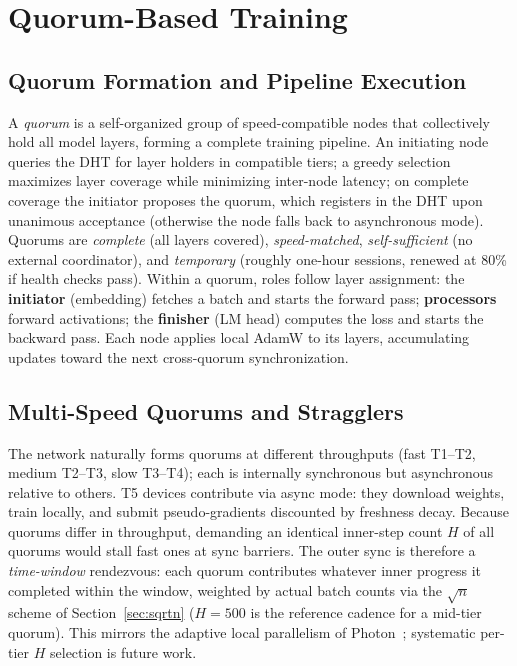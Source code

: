\documentclass[conference]{IEEEtran}
\begin{document}
\section{Quorum-Based Training}
\label{sec:quorum}

\subsection{Quorum Formation and Pipeline Execution}

A \emph{quorum} is a self-organized group of speed-compatible nodes that collectively hold all model layers, forming a complete training pipeline. An initiating node queries the DHT for layer holders in compatible tiers; a greedy selection maximizes layer coverage while minimizing inter-node latency; on complete coverage the initiator proposes the quorum, which registers in the DHT upon unanimous acceptance (otherwise the node falls back to asynchronous mode). Quorums are \emph{complete} (all layers covered), \emph{speed-matched}, \emph{self-sufficient} (no external coordinator), and \emph{temporary} (roughly one-hour sessions, renewed at 80\% if health checks pass). Within a quorum, roles follow layer assignment: the \textbf{initiator} (embedding) fetches a batch and starts the forward pass; \textbf{processors} forward activations; the \textbf{finisher} (LM head) computes the loss and starts the backward pass. Each node applies local AdamW to its layers, accumulating updates toward the next cross-quorum synchronization.

\subsection{Multi-Speed Quorums and Stragglers}
\label{sec:multispeed}

The network naturally forms quorums at different throughputs (fast T1--T2, medium T2--T3, slow T3--T4); each is internally synchronous but asynchronous relative to others. T5 devices contribute via async mode: they download weights, train locally, and submit pseudo-gradients discounted by freshness decay. Because quorums differ in throughput, demanding an identical inner-step count $H$ of all quorums would stall fast ones at sync barriers. The outer sync is therefore a \emph{time-window} rendezvous: each quorum contributes whatever inner progress it completed within the window, weighted by actual batch counts via the $\sqrt{n}$ scheme of Section~\ref{sec:sqrtn} ($H{=}500$ is the reference cadence for a mid-tier quorum). This mirrors the adaptive local parallelism of Photon~\cite{sani2024photon}; systematic per-tier $H$ selection is future work.
\end{document}
